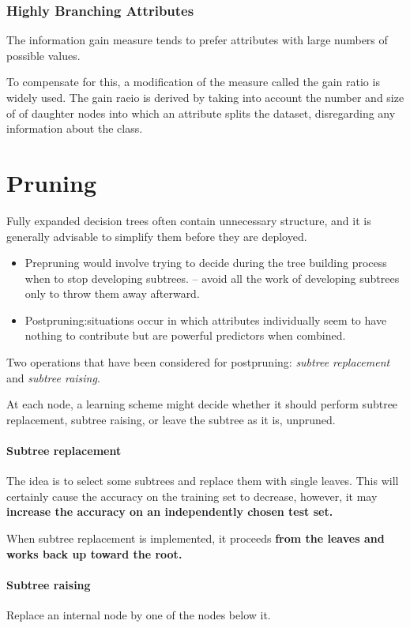 \subsubsection{Highly Branching Attributes}
The information gain measure tends to prefer attributes with large numbers
of possible values.

To compensate for this, a modification of the measure called the gain
ratio is widely used.  The gain raeio is derived by taking into account
the number and size of of daughter nodes into which an attribute splits
the dataset, disregarding any information about the class.

\section{Pruning}
Fully expanded decision trees often contain unnecessary structure, and it
is generally advisable to simplify them before they are deployed.

\begin{itemize}
    \item Prepruning would involve trying to decide during the tree
        building process when to stop developing subtrees. -- avoid all
        the work of developing subtrees only to throw them away afterward.
    \item Postpruning:situations occur in which attributes individually
        seem to have nothing to contribute but are powerful predictors
        when combined.
\end{itemize}
Two operations that have been considered for postpruning: \emph{subtree
replacement} and \emph{subtree raising}.

At each node, a learning scheme might decide whether it should perform
subtree replacement, subtree raising, or leave the subtree as it is,
unpruned.

\paragraph{Subtree replacement}
The idea is to select some subtrees and replace them with single leaves.
This will certainly cause the accuracy on the training set to decrease,
however, it may \textbf{increase the accuracy on an independently chosen
test set.}

When subtree replacement is implemented, it proceeds \textbf{from the leaves and
works back up toward the root.}
\paragraph{Subtree raising}
Replace an internal node by one of the nodes below it.

